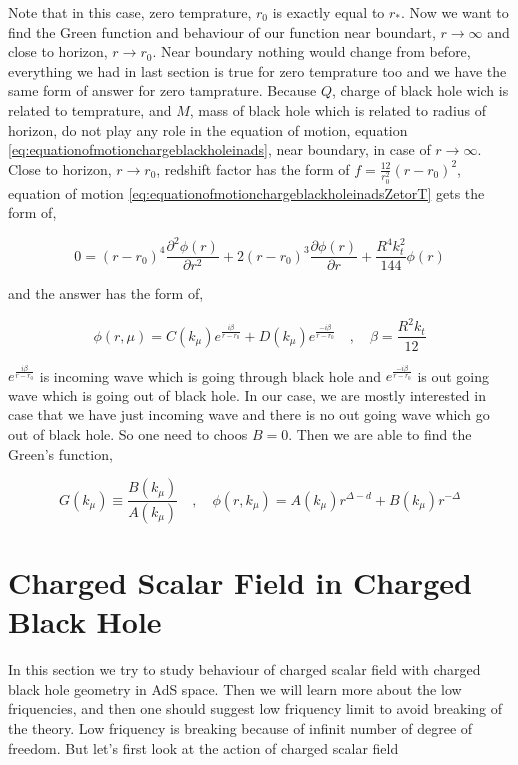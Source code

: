 Note that in this case, zero temprature, $r_0$ is exactly equal to $r_*$. Now we want to find the Green function and behaviour of our function near boundart, $r \rightarrow \infty$ and close to horizon, $r \rightarrow r_0$. Near boundary nothing would change from before, everything we had in last section is true for zero temprature too and we have the same form of answer for zero tamprature. Because $Q$, charge of black hole wich is related to temprature, and $M$, mass of black hole which is related to radius of horizon, do not play any role in the equation of motion, equation \ref{eq:equationofmotionchargeblackholeinads}, near boundary, in case of $r \rightarrow \infty$. Close to horizon, $r \rightarrow r_0$, redshift factor has the form of $f = \frac{12}{r^2_0}(r-r_0)^2$, equation of motion \ref{eq:equationofmotionchargeblackholeinadsZetorT} gets the form of,

\begin{equation}
    0 = (r-r_0)^4\frac{\partial^2\phi(r)}{\partial r^2} + 2(r-r_0)^3\frac{\partial\phi(r)}{\partial r} + \frac{R^4k^2_t}{144}\phi(r)
\end{equation}

and the answer has the form of,

\begin{equation}
    \phi(r,\mu) = C(k_\mu) e^{\frac{i\beta}{r-r_0}} + D(k_\mu) e^{\frac{-i\beta}{r-r_0}} \quad , \quad \beta = \frac{R^2k_t}{12}
\end{equation}

$e^{\frac{i\beta}{r-r_0}}$ is incoming wave which is going through black hole and $e^{\frac{-i\beta}{r-r_0}}$ is out going wave which is going out of black hole. In our case, we are mostly interested in case that we have just incoming wave and there is no out going wave which go out of black hole. So one need to choos $B = 0$. Then we are able to find the Green's function,

\begin{equation}
   G(k_\mu) \equiv \frac{B(k_\mu)}{A(k_\mu)} \quad , \quad \phi(r,k_\mu) = A(k_\mu)r^{\Delta-d} + B(k_\mu)r^{-\Delta}  
\end{equation} 

\section{Charged Scalar Field in Charged Black Hole} \label{sec:ChargedScalarFieldinChargedBlackHole}

In this section we try to study behaviour of charged scalar field with charged black hole geometry in AdS space. Then we will learn more about the low friquencies, and then one should suggest low friquency limit to avoid breaking of the theory. Low friquency is breaking because of infinit number of degree of freedom. But let's first look at the action of charged scalar field


